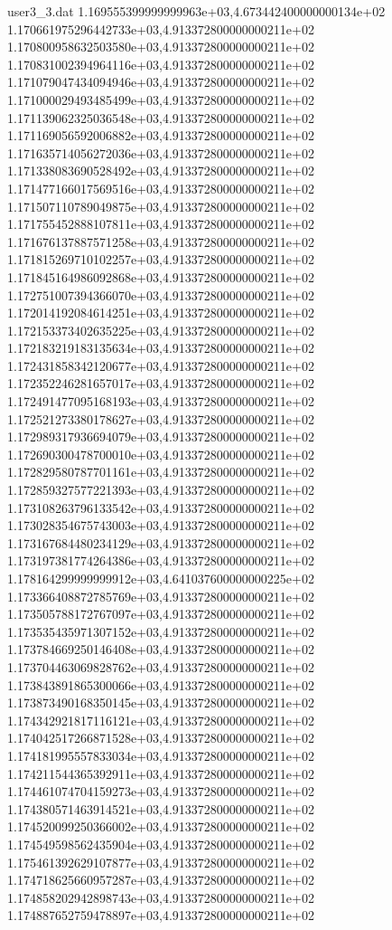 \begin{filecontents}{user3_3.dat}
1.169555399999999963e+03,4.673442400000000134e+02
1.170661975296442733e+03,4.913372800000000211e+02
1.170800958632503580e+03,4.913372800000000211e+02
1.170831002394964116e+03,4.913372800000000211e+02
1.171079047434094946e+03,4.913372800000000211e+02
1.171000029493485499e+03,4.913372800000000211e+02
1.171139062325036548e+03,4.913372800000000211e+02
1.171169056592006882e+03,4.913372800000000211e+02
1.171635714056272036e+03,4.913372800000000211e+02
1.171338083690528492e+03,4.913372800000000211e+02
1.171477166017569516e+03,4.913372800000000211e+02
1.171507110789049875e+03,4.913372800000000211e+02
1.171755452888107811e+03,4.913372800000000211e+02
1.171676137887571258e+03,4.913372800000000211e+02
1.171815269710102257e+03,4.913372800000000211e+02
1.171845164986092868e+03,4.913372800000000211e+02
1.172751007394366070e+03,4.913372800000000211e+02
1.172014192084614251e+03,4.913372800000000211e+02
1.172153373402635225e+03,4.913372800000000211e+02
1.172183219183135634e+03,4.913372800000000211e+02
1.172431858342120677e+03,4.913372800000000211e+02
1.172352246281657017e+03,4.913372800000000211e+02
1.172491477095168193e+03,4.913372800000000211e+02
1.172521273380178627e+03,4.913372800000000211e+02
1.172989317936694079e+03,4.913372800000000211e+02
1.172690300478700010e+03,4.913372800000000211e+02
1.172829580787701161e+03,4.913372800000000211e+02
1.172859327577221393e+03,4.913372800000000211e+02
1.173108263796133542e+03,4.913372800000000211e+02
1.173028354675743003e+03,4.913372800000000211e+02
1.173167684480234129e+03,4.913372800000000211e+02
1.173197381774264386e+03,4.913372800000000211e+02
1.178164299999999912e+03,4.641037600000000225e+02
1.173366408872785769e+03,4.913372800000000211e+02
1.173505788172767097e+03,4.913372800000000211e+02
1.173535435971307152e+03,4.913372800000000211e+02
1.173784669250146408e+03,4.913372800000000211e+02
1.173704463069828762e+03,4.913372800000000211e+02
1.173843891865300066e+03,4.913372800000000211e+02
1.173873490168350145e+03,4.913372800000000211e+02
1.174342921817116121e+03,4.913372800000000211e+02
1.174042517266871528e+03,4.913372800000000211e+02
1.174181995557833034e+03,4.913372800000000211e+02
1.174211544365392911e+03,4.913372800000000211e+02
1.174461074704159273e+03,4.913372800000000211e+02
1.174380571463914521e+03,4.913372800000000211e+02
1.174520099250366002e+03,4.913372800000000211e+02
1.174549598562435904e+03,4.913372800000000211e+02
1.175461392629107877e+03,4.913372800000000211e+02
1.174718625660957287e+03,4.913372800000000211e+02
1.174858202942898743e+03,4.913372800000000211e+02
1.174887652759478897e+03,4.913372800000000211e+02

\end{filecontents}
